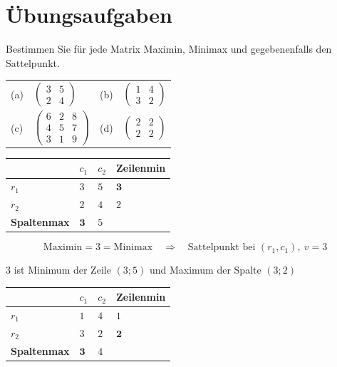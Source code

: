 \section{Übungsaufgaben}

\begin{aufgabe}
Bestimmen Sie für jede Matrix Maximin, Minimax und gegebenenfalls den Sattelpunkt.
\begin{center}
{\small
\renewcommand{\arraystretch}{1.44}
\begin{tabular}{@{}P{1.0cm}P{2.6cm}P{1.0cm}P{2.6cm}@{}}
\toprule
(a) & $\begin{pmatrix}3&5\\2&4\end{pmatrix}$ & (b) & $\begin{pmatrix}1&4\\3&2\end{pmatrix}$\\[12pt]
(c) & $\begin{pmatrix}6&2&8\\4&5&7\\3&1&9\end{pmatrix}$ & (d) & $\begin{pmatrix}2&2\\2&2\end{pmatrix}$\\
\bottomrule
\end{tabular}}
\end{center}

\loesung
{}
\begin{center}
\renewcommand{\arraystretch}{1.46}
\begin{tabular}{@{}P{2.2cm}P{1.1cm}P{1.1cm}P{1.9cm}@{}}
\toprule
& $c_1$ & $c_2$ & \textbf{Zeilenmin}\\
\midrule
$r_1$ & $3$ & $5$ & $\mathbf{3}$\\
$r_2$ & $2$ & $4$ & $2$\\
\midrule
\textbf{Spaltenmax} & $\mathbf{3}$ & $5$ & \\
\bottomrule
\end{tabular}
\end{center}

\[ \text{Maximin} = 3 = \text{Minimax} \quad\Longrightarrow\quad \text{Sattelpunkt bei } (r_1,c_1), \ v = 3 \]

 $3$ ist Minimum der Zeile $(3;5)$ \checkmark und Maximum der Spalte $(3;2)$ \checkmark

\begin{center}
\renewcommand{\arraystretch}{1.46}
\begin{tabular}{@{}P{2.2cm}P{1.1cm}P{1.1cm}P{1.9cm}@{}}
\toprule
& $c_1$ & $c_2$ & \textbf{Zeilenmin}\\
\midrule
$r_1$ & $1$ & $4$ & $1$\\
$r_2$ & $3$ & $2$ & $\mathbf{2}$\\
\midrule
\textbf{Spaltenmax} & $\mathbf{3}$ & $4$ & \\
\bottomrule
\end{tabular}
\end{center}


\end{aufgabe}

